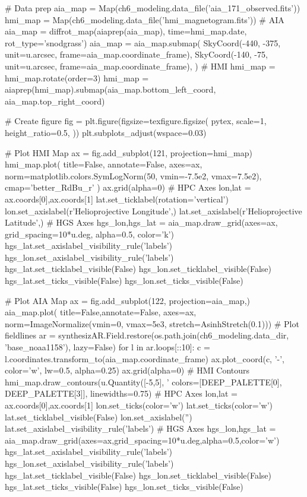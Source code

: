 \begin{pycode}
# Data prep
aia_map = Map(ch6_modeling.data_file('aia_171_observed.fits'))
hmi_map = Map(ch6_modeling.data_file('hmi_magnetogram.fits'))
# AIA
aia_map = diffrot_map(aiaprep(aia_map), time=hmi_map.date, rot_type='snodgrass')
aia_map = aia_map.submap(
    SkyCoord(-440, -375, unit=u.arcsec, frame=aia_map.coordinate_frame),
    SkyCoord(-140, -75, unit=u.arcsec, frame=aia_map.coordinate_frame),
)
# HMI
hmi_map = hmi_map.rotate(order=3)
hmi_map = aiaprep(hmi_map).submap(aia_map.bottom_left_coord, aia_map.top_right_coord)

# Create figure
fig = plt.figure(figsize=texfigure.figsize(
    pytex,
    scale=1,
    height_ratio=0.5,       
))
plt.subplots_adjust(wspace=0.03)

# Plot HMI Map
ax = fig.add_subplot(121, projection=hmi_map)
hmi_map.plot(
    title=False, annotate=False, axes=ax,
    norm=matplotlib.colors.SymLogNorm(50, vmin=-7.5e2, vmax=7.5e2),
    cmap='better_RdBu_r'
)
ax.grid(alpha=0)
# HPC Axes
lon,lat = ax.coords[0],ax.coords[1]
lat.set_ticklabel(rotation='vertical')
lon.set_axislabel(r'Helioprojective Longitude',)
lat.set_axislabel(r'Helioprojective Latitude',)
# HGS Axes
hgs_lon,hgs_lat = aia_map.draw_grid(axes=ax, grid_spacing=10*u.deg, alpha=0.5, color='k')
hgs_lat.set_axislabel_visibility_rule('labels')
hgs_lon.set_axislabel_visibility_rule('labels')
hgs_lat.set_ticklabel_visible(False)
hgs_lon.set_ticklabel_visible(False)
hgs_lat.set_ticks_visible(False)
hgs_lon.set_ticks_visible(False)

# Plot AIA Map
ax = fig.add_subplot(122, projection=aia_map,)
aia_map.plot(
    title=False,annotate=False, axes=ax,
    norm=ImageNormalize(vmin=0, vmax=5e3, stretch=AsinhStretch(0.1)))
# Plot fieldlines
ar = synthesizAR.Field.restore(os.path.join(ch6_modeling.data_dir, 'base_noaa1158'), lazy=False)
for l in ar.loops[::10]:
    c = l.coordinates.transform_to(aia_map.coordinate_frame)
    ax.plot_coord(c, '-', color='w', lw=0.5, alpha=0.25)
ax.grid(alpha=0)
# HMI Contours
hmi_map.draw_contours(u.Quantity([-5,5], '%
                      colors=[DEEP_PALETTE[0], DEEP_PALETTE[3]], linewidths=0.75)
# HPC Axes
lon,lat = ax.coords[0],ax.coords[1]
lon.set_ticks(color='w')
lat.set_ticks(color='w')
lat.set_ticklabel_visible(False)
lon.set_axislabel('')
lat.set_axislabel_visibility_rule('labels')
# HGS Axes
hgs_lon,hgs_lat = aia_map.draw_grid(axes=ax,grid_spacing=10*u.deg,alpha=0.5,color='w')
hgs_lat.set_axislabel_visibility_rule('labels')
hgs_lon.set_axislabel_visibility_rule('labels')
hgs_lat.set_ticklabel_visible(False)
hgs_lon.set_ticklabel_visible(False)
hgs_lat.set_ticks_visible(False)
hgs_lon.set_ticks_visible(False)


\end{pycode}
